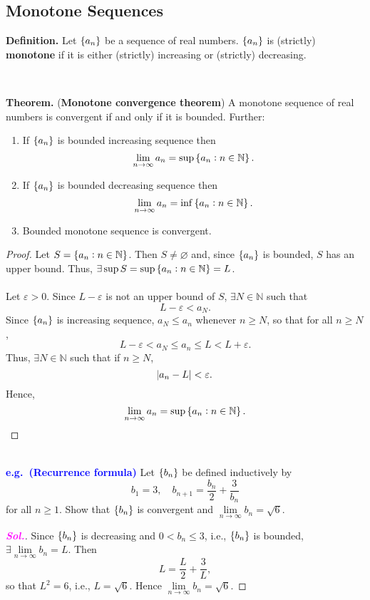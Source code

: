 \documentclass[12pt,a4paper]{article}
\newcommand{\sol}{\textcolor{magenta}{\bf \textit{Sol.}}\quad}
\newcommand{\eg}{\textcolor{blue}{\bf e.g.\ \quad }}
\begin{document}
\subsection{Monotone Sequences}
\begin{tcolorbox}[colback=white]
	\textbf{Definition.} Let $\set{a_n}$ be a sequence of real numbers. $\set{a_n}$ is (strictly) \textbf{monotone} if it is either (strictly) increasing or (strictly) decreasing.
\end{tcolorbox}
\
\begin{tcolorbox}[colback=white]
	\textbf{Theorem.} (\textbf{Monotone convergence theorem}) A monotone sequence of real numbers is convergent if and only if it is bounded. Further: \begin{enumerate}
		\item If $\set{a_n}$ is bounded increasing sequence then \[
		\lim\limits_{n\to\infty}a_n=\sup\set{a_n:n\in\mathbb{N}}.
		\]
		\item If $\set{a_n}$ is bounded decreasing sequence then \[
		\lim\limits_{n\to\infty}a_n=\inf\set{a_n:n\in\mathbb{N}}.
		\]
		\item Bounded monotone sequence is convergent.
	\end{enumerate}\tcblower\begin{proof}
	Let $S=\set{a_n:n\in\mathbb{N}}$. Then $S\neq\varnothing$ and, since $\set{a_n}$ is bounded, $S$ has an upper bound. Thus, $\exists\sup S=\sup\set{a_n:n\in\mathbb{N}}=L$.\\
	\\
	Let $\varepsilon>0$. Since $L-\varepsilon$ is not an upper bound of $S$, $\exists N\in\mathbb{N}$ such that \[
	L-\varepsilon<a_N.
	\] Since $\set{a_n}$ is increasing sequence, $a_N\leq a_n$ whenever $n\geq N$, so that for all $n\geq N$, \[
	L-\varepsilon<a_N\leq a_n\leq L<L+\varepsilon.
	\] Thus, $\exists N\in\mathbb{N}$ such that if $n\geq N$, \[
	\abs{a_n-L}<\varepsilon.
	\] Hence, \[
	\lim\limits_{n\to\infty}a_n=\sup\set{a_n:n\in\mathbb{N}}.
	\]
\end{proof}
\end{tcolorbox}\
\\
\eg \textcolor{blue}{\bf (Recurrence formula)} Let $\set{b_n}$ be defined inductively by \[
b_1=3,\quad b_{n+1}=\frac{b_n}{2}+\frac{3}{b_n}
\] for all $n\geq 1$. Show that $\set{b_n}$ is convergent and $\lim\limits_{n\to\infty}b_n=\sqrt{6}$.
\begin{proof}[\sol]
	Since $\set{b_n}$ is decreasing and $0<b_n\leq 3$, i.e., $\set{b_n}$ is bounded, $\exists\lim\limits_{n\to\infty}b_n=L$. Then \[
	L=\frac{L}{2}+\frac{3}{L},
	\] so that $L^2=6$, i.e., $L=\sqrt{6}$. Hence $\lim\limits_{n\to\infty}b_n=\sqrt{6}$.
\end{proof}
\end{document}

